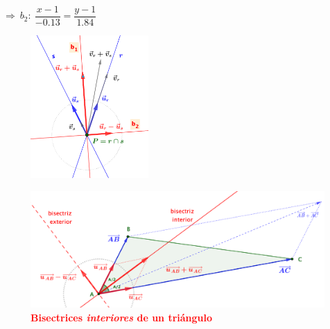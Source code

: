 \begin{cuadro-naranja}
\begin{miejemplo}
\begin{multicols}{2}
\vspace{3mm}$ \Rightarrow \ b_2:\ \dfrac{x-1}{-0.13}=\dfrac{y-1}{1.84}$

\begin{figure}[H]
	\centering
	\includegraphics[width=0.4\textwidth]{img-lg/lg03.png}
\end{figure}
\end{multicols}	
\end{miejemplo}
\vspace{1mm}
\end{cuadro-naranja}

\vspace{5mm}
\begin{figure}[H]
	\centering
	\includegraphics[width=1\textwidth]{img-lg/lg04b.png}
	\caption*{\textcolor{red}{\textbf{Bisectrices \emph{interiores} de un triángulo}}}
\end{figure}


